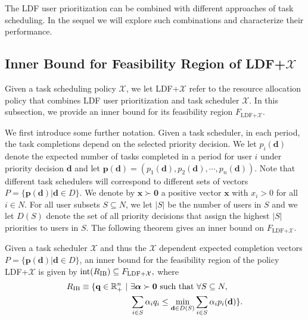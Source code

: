 \documentclass[prodmode,acmtompecs]{acmsmall}
\newcommand{\reqvec}{\mathbf{q}}
\newcommand{\reqscalar}{q}
\newcommand{\ribvec}{\boldsymbol{\alpha}}
\newcommand{\ribscalar}{\alpha}
\newcommand{\feasibilityRegion}{F}
\newcommand{\fullUserSet}{N}
\newcommand{\taskScheduler}{\mathcal{X}}
\newcommand{\myComments}[1]{}
\newif\iftompecs
\newcommand{\tompecsStart}{\iftompecs \myComments{TOMPECS version: }}
\newcommand{\commentEnd}{\myComments{End}}
\begin{document}
The LDF user prioritization can be combined with different approaches of task scheduling. In the sequel we will explore such combinations and characterize their performance. 

\subsection{Inner Bound for Feasibility Region of LDF+$\taskScheduler$}
\label{subsection_LDF}
Given a task scheduling policy $\taskScheduler$, we let LDF+$\taskScheduler$ refer to the resource allocation policy that combines LDF user prioritization and task scheduler $\taskScheduler$.
In this subsection, we provide an inner bound for its feasibility region $\feasibilityRegion_{\text{LDF+}\taskScheduler}$.   

We first introduce some further notation. 
Given a task scheduler, in each period, the task completions depend on the selected priority decision. We let $p_i(\mathbf{d})$ denote the expected number of tasks completed in a period for user $i$ under priority decision $\mathbf{d}$ and let $\mathbf{p}(\mathbf{d}) = (p_1(\mathbf{d}), p_2(\mathbf{d}), \cdots, p_n(\mathbf{d}))$. Note that different task schedulers will correspond to different sets of vectors $P = \{\mathbf{p}(\mathbf{d}) | \mathbf{d} \in D\}$. 
We denote by $\mathbf{x} \succ \mathbf{0}$ a positive vector $\mathbf{x}$ with $x_i > 0$ for all $i\in \fullUserSet$. For all user subsets $S \subseteq \fullUserSet$, we let $|S|$ be the number of users in $S$ and we let $D(S)$ denote the set of all priority decisions that assign the highest $|S|$ priorities to users in $S$. 
The following theorem gives an inner bound on $\feasibilityRegion_{\text{LDF+$\taskScheduler$}}$. 
\begin{theorem}
\label{thm_R_IB}
Given a task scheduler $\taskScheduler$ and thus the $\taskScheduler$ dependent expected completion vectors $P = \{\mathbf{p}(\mathbf{d}) | \mathbf{d} \in D\}$, an inner bound for the feasibility region of the \tompecsStart resource allocation \commentEnd\fi policy LDF+$\taskScheduler$ is given by
$
\text{int}(R_{\textnormal{IB}}) \subseteq \feasibilityRegion_{\textnormal{LDF+$\taskScheduler$}}, 
$ 
where 
\begin{align*}
R_{\textnormal{IB}} \equiv \{\reqvec \in \mathbb R^n_{+} ~|~ & \exists \ribvec \succ \mathbf{0} \text{ such that } \forall S\subseteq \fullUserSet, \\
& \sum\limits_{i\in S} \ribscalar_i {\reqscalar}_i \leq \min\limits_{\mathbf{d} \in D(S)} \sum\limits_{i\in S} {\ribscalar}_i p_i(\mathbf{d})
\}. 
\end{align*}
\end{theorem}
\end{document}
